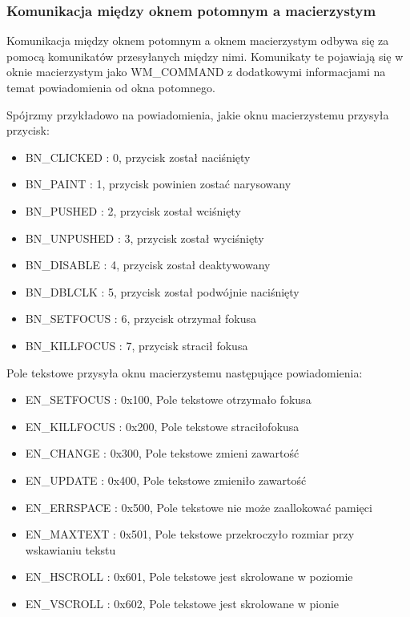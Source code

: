 \subsubsection{Komunikacja między oknem potomnym a macierzystym}

Komunikacja między oknem potomnym a oknem macierzystym odbywa się za pomocą
komunikatów przesyłanych między nimi. Komunikaty te pojawiają się w oknie macierzystym
jako WM\_COMMAND z dodatkowymi informacjami na temat powiadomienia od okna potomnego.

Spójrzmy przykładowo na powiadomienia, jakie oknu macierzystemu przysyła przycisk:
\begin{itemize}
	\item BN\_CLICKED : 0, przycisk został naciśnięty
	\item BN\_PAINT : 1, przycisk powinien zostać narysowany 
	\item BN\_PUSHED : 2, przycisk został wciśnięty
	\item BN\_UNPUSHED : 3, przycisk został wyciśnięty 
	\item BN\_DISABLE : 4, przycisk został deaktywowany
	\item BN\_DBLCLK : 5, przycisk został podwójnie naciśnięty
	\item BN\_SETFOCUS : 6, przycisk otrzymał fokusa
	\item BN\_KILLFOCUS : 7, przycisk stracił fokusa
\end{itemize}
 
Pole tekstowe przysyła oknu macierzystemu następujące powiadomienia:

\begin{itemize}
	\item EN\_SETFOCUS : 0x100, Pole tekstowe otrzymało fokusa
	\item EN\_KILLFOCUS : 0x200, Pole tekstowe straciłofokusa
	\item EN\_CHANGE : 0x300, Pole tekstowe zmieni zawartość
	\item EN\_UPDATE : 0x400, Pole tekstowe zmieniło zawartość
	\item EN\_ERRSPACE : 0x500, Pole tekstowe nie może zaallokować pamięci
	\item EN\_MAXTEXT : 0x501, Pole tekstowe przekroczyło rozmiar przy wskawianiu tekstu
	\item EN\_HSCROLL : 0x601, Pole tekstowe jest skrolowane w poziomie
	\item EN\_VSCROLL : 0x602, Pole tekstowe jest skrolowane w pionie
\end{itemize}

